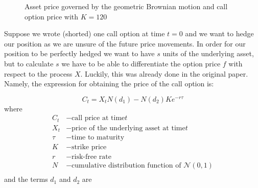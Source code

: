 \documentclass[times, utf8, diplomski]{fer}
\begin{document}
\begin{figure}[ht]
\centering

\caption{Asset price governed by the geometric Brownian motion and call option price with $K=120$}
\label{fig:gbm_price_process}	
\end{figure}
\noindent Suppose we wrote (shorted) one call option at time $t=0$ and we want to hedge our position as we are unsure of the future price movements. In order for our position to be perfectly hedged we want to have $s$ units of the underlying asset, but to calculate $s$ we have to be able to differentiate the option price $f$ with respect to the process $X$. Luckily, this was already done in the original \cite{black_pricing_nodate} paper. Namely, the expression for obtaining the price of the call option is:

\begin{equation} \label{eqn:bs_call}
	C_t = X_tN(d_1) - N(d_2)Ke^{-r\tau}
\end{equation}
where
\begin{align*}
	C_t &- \mbox{call price at time} t \\
	X_t &- \mbox{price of the underlying asset at time} t \\
	\tau &- \mbox{time to maturity} \\
	K &- \mbox{strike price} \\
	r &- \mbox{risk-free rate} \\
	N &- \mbox{cumulative distribution function of } \mathcal{N}(0,1) \\
\end{align*}
and the terms $d_1$ and $d_2$ are
\end{document}
